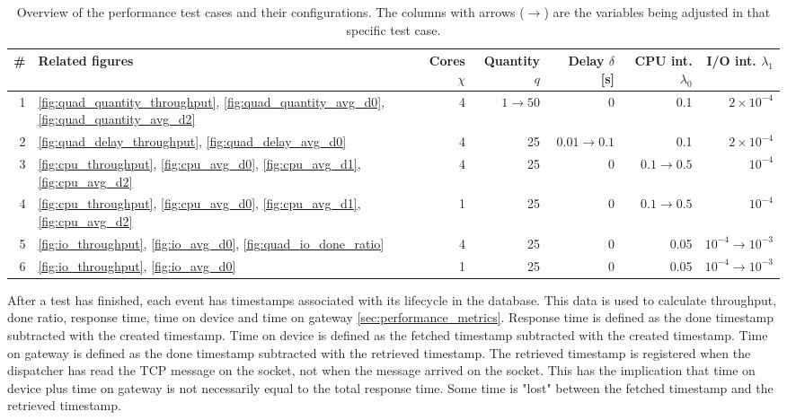 \bgroup
\def\arraystretch{1.2}
\begin{table}[h!]

    \caption[Overview of the performance test cases.]{Overview of the
    performance test cases and their configurations.  The columns with arrows
    ($\rightarrow$) are the variables being adjusted in that specific test
    case.}

    \label{tab:test_overview}
\begin{center}
\begin{tabular}{|r|l|r|r|r|r|r|}
    \hline
    \# & Related figures & Cores $\chi$ & Quantity $q$ & Delay $\delta$ [s] & CPU int. $\lambda_0$ & I/O int. $\lambda_1$ \\
    \hline
    1 & \ref{fig:quad_quantity_throughput}, \ref{fig:quad_quantity_avg_d0},
    \ref{fig:quad_quantity_avg_d2} & 4 & $1 \rightarrow 50$ & 0 & 0.1 & $2
    \times 10^{-4}$ \\
    \hline
    2 & \ref{fig:quad_delay_throughput}, \ref{fig:quad_delay_avg_d0} & 4 & 25 &
    $0.01 \rightarrow 0.1$ & 0.1 & $2 \times 10^{-4}$ \\
    \hline
    3 & \ref{fig:cpu_throughput}, \ref{fig:cpu_avg_d0}, \ref{fig:cpu_avg_d1},
    \ref{fig:cpu_avg_d2} & 4 & 25 & 0 & $0.1 \rightarrow 0.5$ & $10^{-4}$ \\
    \hline
    4 & \ref{fig:cpu_throughput}, \ref{fig:cpu_avg_d0}, \ref{fig:cpu_avg_d1},
    \ref{fig:cpu_avg_d2} & 1 & 25 & 0 & $0.1 \rightarrow 0.5$ & $10^{-4}$ \\
    \hline
    5 & \ref{fig:io_throughput}, \ref{fig:io_avg_d0},
    \ref{fig:quad_io_done_ratio} & 4 & 25 & 0 & 0.05 & $10^{-4} \rightarrow 10^{-3}$ \\
    \hline
    6 & \ref{fig:io_throughput}, \ref{fig:io_avg_d0} & 1 & 25 & 0 & 0.05 & $10^{-4} \rightarrow 10^{-3}$ \\
    \hline
\end{tabular}
\end{center}
\end{table}

After a test has finished, each event has timestamps associated with its
lifecycle in the database. This data is used to calculate throughput, done
ratio, response time, time on device and time on gateway
\ref{sec:performance_metrics}. Response time is defined as the done timestamp
subtracted with the created timestamp. Time on device is defined as the fetched
timestamp subtracted with the created timestamp. Time on gateway is defined as
the done timestamp subtracted with the retrieved timestamp. The retrieved
timestamp is registered when the dispatcher has read the TCP message on the
socket, not when the message arrived on the socket. This has the implication
that time on device plus time on gateway is not necessarily equal to the total
response time. Some time is "lost" between the fetched timestamp and the
retrieved timestamp.

